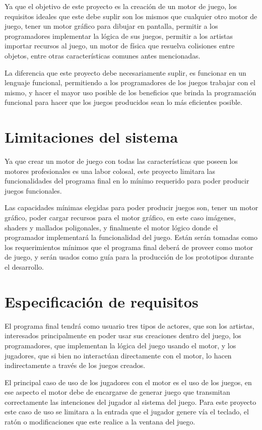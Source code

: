 Ya que el objetivo de este proyecto es la creación de un motor de juego, los requisitos ideales que este debe suplir son los mismos que cualquier otro motor de juego, tener un motor gráfico para dibujar en pantalla, permitir a los programadores implementar la lógica de sus juegos, permitir a los artistas importar recursos al juego, un motor de física que resuelva colisiones entre objetos, entre otras características comunes antes mencionadas.

La diferencia que este proyecto debe necesariamente suplir, es funcionar en un lenguaje funcional, permitiendo a los programadores de los juegos trabajar con el mismo, y hacer el mayor uso posible de los beneficios que brinda la programación funcional para hacer que los juegos producidos sean lo más eficientes posible.

\section{Limitaciones del sistema}

Ya que crear un motor de juego con todas las características que poseen los motores profesionales es una labor colosal, este proyecto limitara las funcionalidades del programa final en lo mínimo requerido para poder producir juegos funcionales.

Las capacidades mínimas elegidas para poder producir juegos son, tener un  motor gráfico, poder cargar recursos para el motor gráfico, en este caso imágenes, shaders y mallados poligonales, y finalmente el motor lógico donde el programador implementará la funcionalidad del juego. Están serán tomadas como los requerimientos  mínimos que el programa final deberá de proveer como motor de juego, y serán usados como guía para la producción de los prototipos durante el desarrollo.

\section{Especificación de requisitos}

El programa final tendrá como usuario tres tipos de actores, que son los artistas, interesados principalmente en poder usar sus creaciones dentro del juego, los programadores, que implementan la lógica del juego usando el motor, y los jugadores, que si bien no interactúan directamente con el motor, lo hacen indirectamente a través de los juegos creados.

El principal caso de uso de los jugadores con el motor es el uso de los juegos, en ese aspecto el motor debe de encargarse de generar juego que transmitan correctamente las intenciones del jugador al sistema del juego. Para este proyecto este caso de uso se limitara a la entrada que el jugador genere vía el teclado, el ratón o modificaciones que este realice a la ventana del juego.


